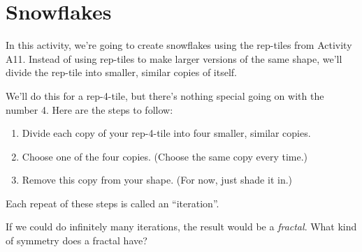 \newpage
\section{Snowflakes}

In this activity, we're going to create snowflakes using the rep-tiles from Activity A11.  Instead of using rep-tiles to make larger versions of the same shape, we'll divide the rep-tile into smaller, similar copies of itself.

We'll do this for a rep-4-tile, but there's nothing special going on with the number 4.  Here are the steps to follow:
\begin{enumerate}
	\item Divide each copy of your rep-4-tile into four smaller, similar copies.
	\item Choose one of the four copies.  (Choose the same copy every time.)
	\item Remove this copy from your shape.  (For now, just shade it in.)
\end{enumerate}
  Each repeat of these steps is called an ``iteration''.
  
If we could do infinitely many iterations, the result would be a \textit{fractal}.  What kind of symmetry does a fractal have?


\break

